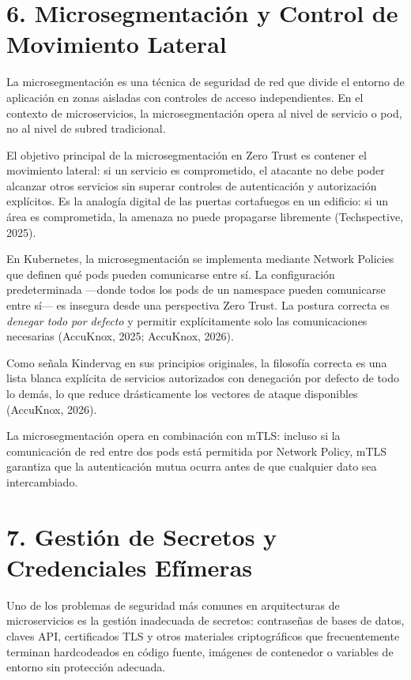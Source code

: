\documentclass[12pt,a4paper]{article}
\begin{document}
\section{6. Microsegmentación y Control de Movimiento Lateral}

La microsegmentación es una técnica de seguridad de red que divide el entorno de aplicación en zonas aisladas con controles de acceso independientes. En el contexto de microservicios, la microsegmentación opera al nivel de servicio o pod, no al nivel de subred tradicional.

El objetivo principal de la microsegmentación en Zero Trust es contener el movimiento lateral: si un servicio es comprometido, el atacante no debe poder alcanzar otros servicios sin superar controles de autenticación y autorización explícitos. Es la analogía digital de las puertas cortafuegos en un edificio: si un área es comprometida, la amenaza no puede propagarse libremente (Techspective, 2025).

En Kubernetes, la microsegmentación se implementa mediante Network Policies que definen qué pods pueden comunicarse entre sí. La configuración predeterminada —donde todos los pods de un namespace pueden comunicarse entre sí— es insegura desde una perspectiva Zero Trust. La postura correcta es \textit{denegar todo por defecto} y permitir explícitamente solo las comunicaciones necesarias (AccuKnox, 2025; AccuKnox, 2026).

Como señala Kindervag en sus principios originales, la filosofía correcta es una lista blanca explícita de servicios autorizados con denegación por defecto de todo lo demás, lo que reduce drásticamente los vectores de ataque disponibles (AccuKnox, 2026).

La microsegmentación opera en combinación con mTLS: incluso si la comunicación de red entre dos pods está permitida por Network Policy, mTLS garantiza que la autenticación mutua ocurra antes de que cualquier dato sea intercambiado.



\section{7. Gestión de Secretos y Credenciales Efímeras}

Uno de los problemas de seguridad más comunes en arquitecturas de microservicios es la gestión inadecuada de secretos: contraseñas de bases de datos, claves API, certificados TLS y otros materiales criptográficos que frecuentemente terminan hardcodeados en código fuente, imágenes de contenedor o variables de entorno sin protección adecuada.
\end{document}
